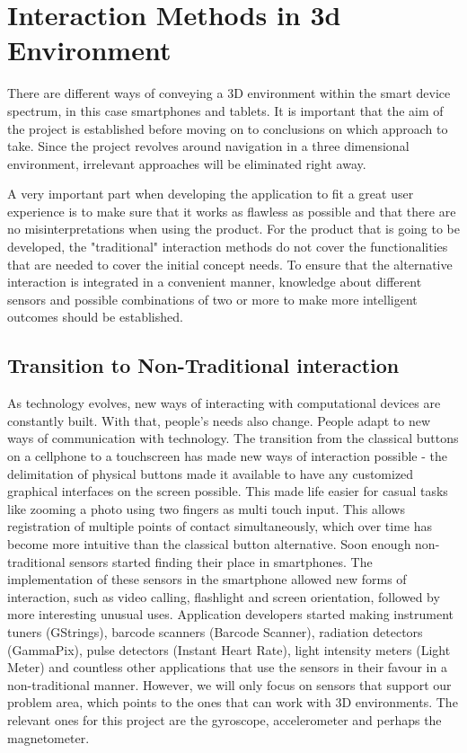 \section{Interaction Methods in 3d Environment}
There are different ways of conveying a 3D environment within the smart device spectrum, in this case smartphones and tablets. It is important that the aim of the project is established before moving on to conclusions on which approach to take. Since the project revolves around navigation in a three dimensional environment, irrelevant approaches will be eliminated right away.

A very important part when developing the application to fit a great user experience is to make sure that it works as flawless as possible and that there are no misinterpretations when using the product. For the product that is going to be developed, the "traditional" interaction methods do not cover the functionalities that are needed to cover the initial concept needs. To ensure that the alternative interaction is integrated in a convenient manner, knowledge about different sensors and possible combinations of two or more to make more intelligent outcomes should be established.


\subsection{Transition to Non-Traditional interaction}
As technology evolves, new ways of interacting with computational devices are constantly built. With that, people's needs also change. People adapt to new ways of communication with technology. \cite{Greenfield}
The transition from the classical buttons on a cellphone to a touchscreen has made new ways of interaction possible - the delimitation of physical buttons made it available to have any customized graphical interfaces on the screen possible. This made life easier for casual tasks like zooming a photo using two fingers as multi touch input. This allows registration of multiple points of contact simultaneously, which over time has become more intuitive than the classical button alternative.
Soon enough non-traditional sensors started finding their place in smartphones. The implementation of these sensors in the smartphone allowed new forms of interaction, such as video calling, flashlight and screen orientation, followed by more interesting unusual uses. Application developers started making instrument tuners (GStrings), barcode scanners (Barcode Scanner), radiation detectors (GammaPix), pulse detectors (Instant Heart Rate), light intensity meters (Light Meter) and countless other applications that use the sensors in their favour in a non-traditional manner. However, we will only focus on sensors that support our problem area, which points to the ones that can work with 3D environments. The relevant ones for this project are the gyroscope, accelerometer and perhaps the magnetometer.

